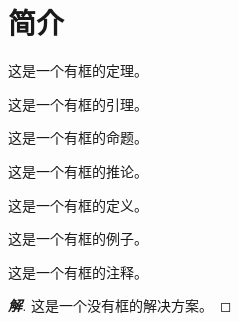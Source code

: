 \documentclass{article}
\newtheorem[M]{boxedtheorem}{\indent 定理}[section]
\newtheorem[M]{boxedlemma}[boxedtheorem]{\indent 引理}
\newtheorem[M]{boxedproposition}[boxedtheorem]{\indent 命题}
\newtheorem[M]{boxedcorollary}[boxedtheorem]{\indent 推论}
\newtheorem[M]{boxeddefinition}[section]{\indent 定义}
\newtheorem[M]{boxedexample}[section]{\indent 例}
\newtheorem[M]{boxedremark}[section]{\indent 注}
\newenvironment{solution}{\begin{proof}[\indent\bf 解]}{\end{proof}}
\begin{document}
\section{简介}

\begin{boxedtheorem}[asdasdasd]
这是一个有框的定理。
\end{boxedtheorem}

\begin{boxedlemma}
这是一个有框的引理。
\end{boxedlemma}

\begin{boxedproposition}
这是一个有框的命题。
\end{boxedproposition}

\begin{boxedcorollary}
这是一个有框的推论。
\end{boxedcorollary}

\begin{boxeddefinition}
这是一个有框的定义。
\end{boxeddefinition}

\begin{boxedexample}
这是一个有框的例子。
\end{boxedexample}

\begin{boxedremark}
这是一个有框的注释。
\end{boxedremark}

\begin{solution}
这是一个没有框的解决方案。
\end{solution}
\end{document}
